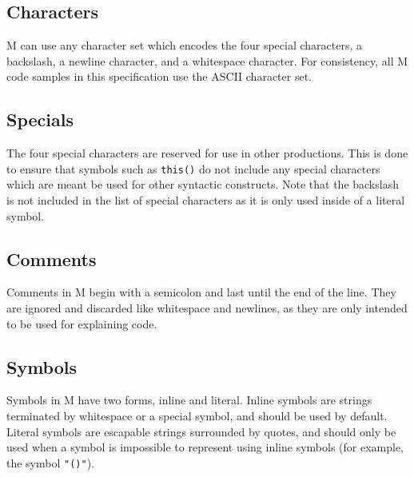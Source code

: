 \documentclass{article}
\begin{document}
    \begin{multicols}{2}
        \subsection{Characters}\label{subsec:characters}

        \begin{minipage}{\columnwidth}
            M can use any character set which encodes the four special characters, a backslash, a newline character, and a whitespace character.
            For consistency, all M code samples in this specification use the ASCII character set.
        \end{minipage}

        \subsection{Specials}\label{subsec:specials}

        \begin{minipage}{\columnwidth}
            The four special characters are reserved for use in other productions.
            This is done to ensure that symbols such as \lstinline$this()$ do not include any special characters which are meant be used for other syntactic constructs.
            Note that the backslash is not included in the list of special characters as it is only used inside of a literal symbol.
        \end{minipage}

        \subsection{Comments}\label{subsec:comments}

        \begin{minipage}{\columnwidth}
            Comments in M begin with a semicolon and last until the end of the line.
            They are ignored and discarded like whitespace and newlines, as they are only intended to be used for explaining code.
        \end{minipage}

        \subsection{Symbols}\label{subsec:symbols}

        \begin{minipage}{\columnwidth}
            Symbols in M have two forms, inline and literal.
            Inline symbols are strings terminated by whitespace or a special symbol, and should be used by default.
            Literal symbols are escapable strings surrounded by quotes, and should only be used when a symbol is impossible to represent using inline symbols (for example, the symbol \lstinline$"()"$).
        \end{minipage}


\end{multicols}
\end{document}
